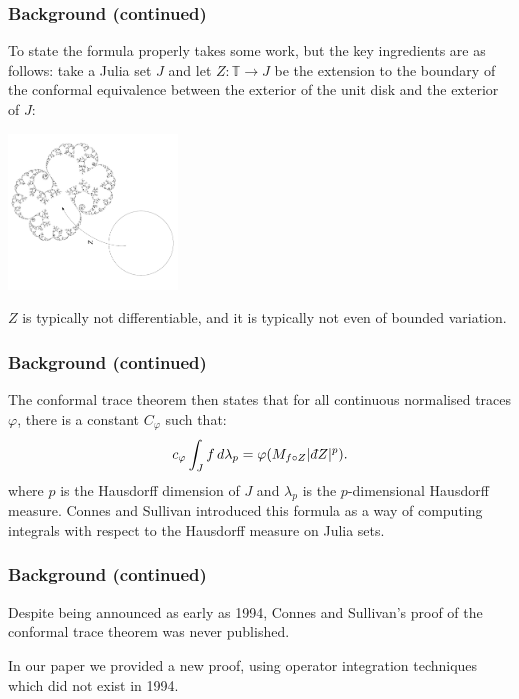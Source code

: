\documentclass{beamer} %
\theoremstyle{definition} %
\newcommand{\Circ}{\mathbb{T}}
\newcommand{\Lc}{\mathcal{L}}
\newcommand{\FiniteRank}{\mathrm{FiniteRank}}
\newcommand{\SepPart}[1]{\overline{\FiniteRank}^{\Lc_{#1,\infty}}}
\def\qd{\,{\mathchar'26\mkern-12mu d}}
\begin{document}
\begin{frame}\frametitle{Background (continued)}
    To state the formula properly takes some work, but the key ingredients are as follows: take a Julia set $J$ and let $Z:\Circ\to J$ be the extension
    to the boundary of the conformal equivalence between the exterior of the unit disk and the exterior of $J$:
    \begin{center}
        \includegraphics[width=45mm]{img/riemann-mapping.png}
    \end{center}
    $Z$ is typically not differentiable, and it is typically not even of bounded variation.
\end{frame}

\begin{frame}\frametitle{Background (continued)}
    The conformal trace theorem then states that for all continuous normalised traces $\varphi$, there is a constant $C_{\varphi}$ such that:
    \begin{equation*}
        c_{\varphi}\int_J f\,d\lambda_p = \varphi(M_{f\circ Z}|\qd Z|^p).
    \end{equation*}
    where $p$ is the Hausdorff dimension of $J$ and $\lambda_p$ is the $p$-dimensional Hausdorff measure. Connes and Sullivan introduced this formula as a way of computing integrals with respect to the Hausdorff measure on Julia sets.
\end{frame}

\begin{frame}\frametitle{Background (continued)}
    Despite being announced as early as 1994, Connes and Sullivan's proof of the conformal trace theorem was never published.
    
    In our paper we provided a new proof, using operator integration techniques which did not exist in 1994.
\end{frame}

\end{document}
